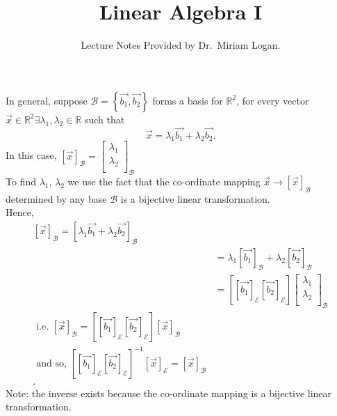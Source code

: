 \documentclass{report}
\begin{document}
\title{Linear Algebra I}
\author{Lecture Notes Provided by Dr.~Miriam Logan.}
\date{}
\maketitle
\tableofcontents
\newpage  
  
In general, suppose $ \mathcal{B} = \left\{ \vec{ b_1},\vec{ b_2}  \right\} $        forms a basis for $ \mathbb{R} ^2 $, for every vector $ \vec{ x} \in \mathbb{R} ^2  \exists  \lambda_1 , \lambda_2 \in \mathbb{R}$ such that
\[
\vec{ x} = \lambda_1 \vec{ b_1} + \lambda_2 \vec{ b_2}
.\] 
In this case, $ \left[ \vec{ x}  \right] _{  \mathcal{B}}= \begin{bmatrix}
\lambda_1\\
\lambda_2\\
\end{bmatrix}
_{  \mathcal{B}} $\\
To find $ \lambda_1$, $ \lambda_{2}$ we use the fact that the co-ordinate mapping $ \vec{ x} \to \left[ \vec{ x}  \right] _{ \mathcal{B}}$ determined by any base $ \mathcal{B}$ is a bijective linear transformation. \\
Hence,
\begin{align*}
 \left[ \vec{ x}  \right] _{  \mathcal{B}} = \left[ \lambda_1 \vec{ b_1} + \lambda_2 \vec{ b_2}  \right] _{  \mathcal{B}}\\
 &= \lambda_1 \left[ \vec{ b_1}  \right] _{  \mathcal{B}} + \lambda_2 \left[ \vec{ b_2}  \right] _{  \mathcal{B}}\\
 &= \left[ \left[ \vec{ b_1}  \right] _{ \mathcal{E}} \left[ \vec{ b_2}  \right] _{ \mathcal{E}} \right] \begin{bmatrix}
 \lambda_1\\
 \lambda_2\\
 \end{bmatrix}
 _{ \mathcal{B}}\\
\text{ i.e. } \left[ \vec{ x}  \right] _{  \mathcal{B}} = \left[  \left[ \vec{ b_1}  \right] _{  \mathcal{E}} \left[ \vec{ b_2}  \right] _{  \mathcal{E}} \right] \left[ \vec{ x}  \right] _{ \mathcal{B}}\\
\text{ and so, }  \left[ \left[ \vec{ b_1}  \right] _{ \mathcal{E}} \left[ \vec{ b_2}  \right] _{ \mathcal{E}}\right] ^{-1} \left[ \vec{ x}  \right] _{ \mathcal{E}} = \left[ \vec{ x}  \right] _{  \mathcal{B}}\\
.\end{align*}
  Note: the inverse exists because the co-ordinate mapping is a bijective linear transformation.\\
\end{document}

